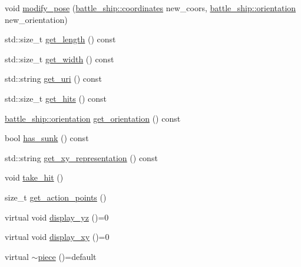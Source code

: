 \begin{DoxyCompactItemize}
\item 
void \hyperlink{classbattle__ship_1_1piece_abfab329108cd431413b3136c3aafec87}{modify\+\_\+pose} (\hyperlink{structbattle__ship_1_1coordinates}{battle\+\_\+ship\+::coordinates} new\+\_\+coors, \hyperlink{namespacebattle__ship_aed87488f0a73f0d0679fe343fb61c784}{battle\+\_\+ship\+::orientation} new\+\_\+orientation)
\item 
std\+::size\+\_\+t \hyperlink{classbattle__ship_1_1piece_aef2b0dd02984f6377a759548da918ace}{get\+\_\+length} () const
\item 
std\+::size\+\_\+t \hyperlink{classbattle__ship_1_1piece_a0ce4fd5c908135e60e8bed1037f1105d}{get\+\_\+width} () const
\item 
std\+::string \hyperlink{classbattle__ship_1_1piece_a9ff7661a72b6b592bba67637aa5a7692}{get\+\_\+uri} () const
\item 
std\+::size\+\_\+t \hyperlink{classbattle__ship_1_1piece_a8f1980da41bbe41633a1659c45e9820f}{get\+\_\+hits} () const
\item 
\hyperlink{namespacebattle__ship_aed87488f0a73f0d0679fe343fb61c784}{battle\+\_\+ship\+::orientation} \hyperlink{classbattle__ship_1_1piece_a4d7a31fb7ab006c7063dbcd346b5935c}{get\+\_\+orientation} () const
\item 
bool \hyperlink{classbattle__ship_1_1piece_a54f1726ec088b6bd8d4d33c07a78548f}{has\+\_\+sunk} () const
\item 
std\+::string \hyperlink{classbattle__ship_1_1piece_a4f52fbc725a70cf355832ec5cf4fd309}{get\+\_\+xy\+\_\+representation} () const
\item 
void \hyperlink{classbattle__ship_1_1piece_a348b7b4c82f37d9668d0cb85e1105129}{take\+\_\+hit} ()
\item 
size\+\_\+t \hyperlink{classbattle__ship_1_1piece_a3b7a39fddca179376ea13b80d4d598ff}{get\+\_\+action\+\_\+points} ()
\item 
virtual void \hyperlink{classbattle__ship_1_1piece_ad46ddc76d6e682a4f1fc8965a0c7813c}{display\+\_\+yz} ()=0
\item 
virtual void \hyperlink{classbattle__ship_1_1piece_a0f900b13641277ae9e809e4baa5c8c10}{display\+\_\+xy} ()=0
\item 
virtual \hyperlink{classbattle__ship_1_1piece_a0336e9dffdbe4da49f29177b77ae4030}{$\sim$piece} ()=default
\end{DoxyCompactItemize}
